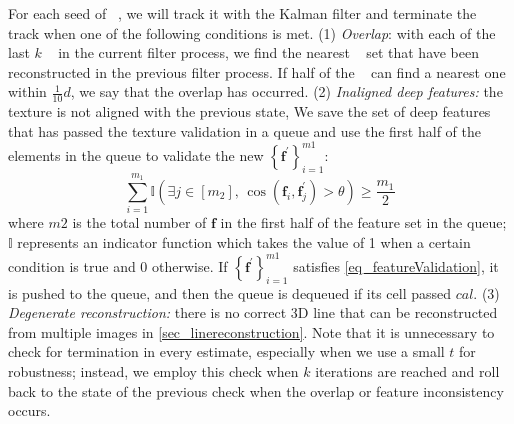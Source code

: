 For each seed of \rlp~,
we will track it with the Kalman filter and terminate the track when one of the following conditions is met.
(1) \textit{Overlap}:
with each of the last $k$ \rlp~ in the current filter process, 
we find the nearest \rlp~ set that have been reconstructed in the previous filter process.
If half of the \rlp~ can find a nearest one within $\frac{1}{10}d$,
we say that the overlap has occurred.
(2) \textit{Inaligned deep features:}
the texture is not aligned with the previous state,
We save the set of deep features that has passed the texture validation in a queue and use the first half of the elements in the queue to validate the new $\left\{\mathbf f^\prime\right\}_{i=1}^{m1}$:
\begin{equation}
\sum_{i=1}^{m_1} \mathbb{I} \left( \exists j \in \left[ m_2 \right], \, \cos \left( \mathbf{f}_i, \mathbf f^{\prime}_j \right) > \theta \right) \geq \frac{m_1}{2}
\label{eq_featureValidation}
\end{equation}
where $m2$ is the total number of $\mathbf f$ in the first half of the feature set in the queue;
$\mathbb{I}$ represents an indicator function which takes the value of 1 when a certain condition is true and 0 otherwise.
If $\left\{\mathbf f^\prime\right\}_{i=1}^{m1}$ satisfies \cref{eq_featureValidation},
it is pushed to the queue, 
and then the queue is dequeued if its cell passed $cal$.
(3) \textit{Degenerate reconstruction:}
there is no correct 3D line that can be reconstructed from multiple images in \cref{sec_linereconstruction}.
Note that
it is unnecessary to check for termination in every estimate, especially when we use a small $t$ for robustness;
instead,
we employ this check when $k$ iterations are reached and roll back to the state of the previous check when the overlap or feature inconsistency occurs. 

